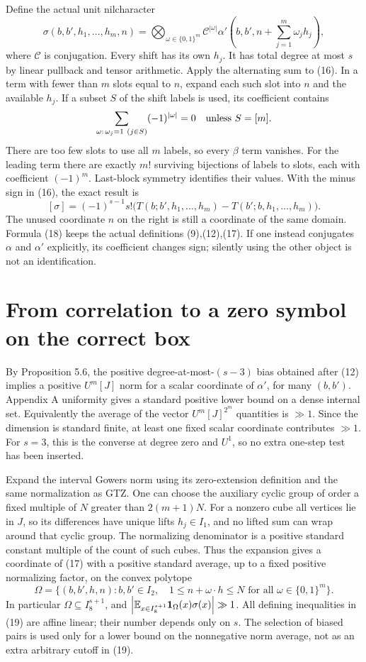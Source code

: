 \documentclass[11pt]{article}
\newcommand{\one}{\mathbf1}
\begin{document}
Define the actual unit nilcharacter
\[
 \sigma(b,b',h_1,\ldots,h_m,n)=
 \bigotimes_{\omega\in\{0,1\}^m}\mathcal C^{|\omega|}
   \alpha'\left(b,b',n+\sum_{j=1}^m\omega_jh_j\right),    \tag{17}
\]
where $\mathcal C$ is conjugation. Every shift has its own $h_j$.
It has total degree at most $s$ by linear pullback and tensor arithmetic.
Apply the alternating sum to (16). In a term with fewer than $m$ slots
equal to $n$, expand each such slot into $n$ and the available $h_j$.
If a subset $S$ of the shift labels is used, its coefficient contains
\[
 \sum_{\omega:\,\omega_j=1\ (j\in S)}(-1)^{|\omega|}=0
 \quad\hbox{unless }S=[m].
\]
There are too few slots to use all $m$ labels, so every $\beta$ term
vanishes. For the leading term there are exactly $m!$ surviving bijections
of labels to slots, each with coefficient $(-1)^m$. Last-block symmetry
identifies their values. With the minus sign in (16), the exact result is
\[
 [\sigma]=(-1)^{s-1}s!
 \bigl(T(b;b',h_1,\ldots,h_m)-T(b';b,h_1,\ldots,h_m)\bigr). \tag{18}
\]
The unused coordinate $n$ on the right is still a coordinate of the same
domain. Formula (18) keeps the actual definitions (9),(12),(17). If one
instead conjugates $\alpha$ and $\alpha'$ explicitly, its coefficient
changes sign; silently using the other object is not an identification.

\section{From correlation to a zero symbol on the correct box}
By Proposition 5.6, the positive degree-at-most-$(s-3)$ bias obtained
after (12) implies a positive $U^m[J]$ norm for a scalar coordinate of
$\alpha'$, for many $(b,b')$. Appendix A uniformity gives a standard
positive lower bound on a dense internal set. Equivalently the average
of the vector $U^m[J]^{2^m}$ quantities is $\gg1$. Since the dimension is
standard finite, at least one fixed scalar coordinate contributes $\gg1$.
For $s=3$, this is the converse at degree zero and $U^1$, so no extra
one-step test has been inserted.

Expand the interval Gowers norm using its zero-extension definition and
the same normalization as GTZ. One can choose the auxiliary cyclic group
of order a fixed multiple of $N$ greater than $2(m+1)N$. For a nonzero
cube all vertices lie in $J$, so its differences have unique lifts
$h_j\in I_1$, and no lifted sum can wrap around that cyclic group.
The normalizing denominator is a positive standard constant multiple of
the count of such cubes. Thus the expansion gives a coordinate of (17)
with a positive standard average, up to a fixed positive normalizing factor,
on the convex polytope
\[
 \Omega=\{(b,b',h,n): b,b'\in I_2,\quad
       1\leq n+\omega\cdot h\leq N\text{ for all }\omega\in\{0,1\}^m\}.
                                                               \tag{19}
\]
In particular $\Omega\subseteq I_8^{s+1}$, and
$\left|\E_{x\in I_8^{s+1}}\one_\Omega(x)\sigma(x)\right|\gg1$.
All defining inequalities in (19) are affine linear; their number depends
only on $s$. The selection of biased pairs is used only for a lower bound
on the nonnegative norm average, not as an extra arbitrary cutoff in (19).
\end{document}

